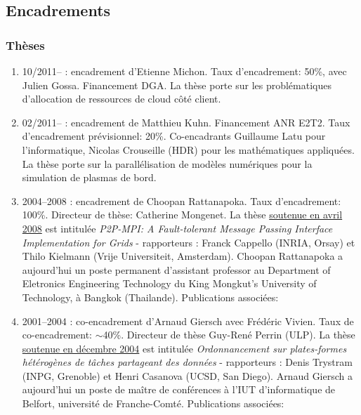 \documentclass[11pt]{article}
\begin{document}
\subsection{Encadrements}

\subsubsection{Thèses}
\begin{enumerate}

\item 10/2011-- : encadrement d'Etienne Michon. Taux d'encadrement: 50\%,
avec Julien Gossa. Financement DGA. La thèse porte sur les problématiques
d'allocation de ressources de cloud côté client.\\

\item  02/2011-- :  encadrement de  Matthieu Kuhn.  Financement ANR  E2T2.  Taux
  d'encadrement   prévisionnel:   20\%.   Co-encadrants  Guillaume   Latu   pour
  l'informatique, Nicolas  Crouseille (HDR)  pour les  mathématiques appliquées.
  La thèse porte sur la parallélisation de modèles numériques pour la simulation
  de plasmas de bord.\\

\item 2004--2008 : encadrement de Choopan Rattanapoka. Taux d'encadrement: 100\%. 
Directeur de thèse: Catherine Mongenet. La thèse \underline{soutenue en avril 2008} 
est intitulée \textit{P2P-MPI: A Fault-tolerant Message Passing Interface Implementation 
for Grids} - rapporteurs : Franck Cappello (INRIA, Orsay) et Thilo Kielmann (Vrije 
Universiteit, Amsterdam). Choopan Rattanapoka a aujourd'hui un poste permanent 
d'assistant professor au Department of Eletronics Engineering Technology du King 
Mongkut's University of Technology, à Bangkok (Thailande).
Publications associées: 
\cite{icps-2005-155,icps-2007-182,icps-2007-185,
      icps-2008-188,icps-2008-193,icps-2009-214,
	icps-2009-217,icps-book}\\


\item 2001--2004 : co-encadrement d'Arnaud Giersch avec Frédéric Vivien. 
Taux de co-encadrement: $\sim$40\%. Directeur de thèse Guy-René Perrin (ULP).
La thèse \underline{soutenue en décembre 2004} est intitulée \textit{Ordonnancement 
sur plates-formes hétérogènes de tâches partageant des données} - rapporteurs : Denis 
Trystram (INPG, Grenoble) et Henri Casanova (UCSD, San Diego). Arnaud Giersch a 
aujourd'hui un poste de maître de conférences à l'IUT d'informatique de Belfort, 
université de Franche-Comté.
Publications associées: \cite{icps-2002-62,icps-2003-75,icps-2004-125}\\



\end{enumerate}
\end{document}
